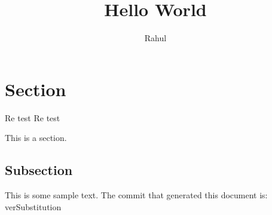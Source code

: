 \documentclass[12pt]{article}
\title{Hello World}
\author{Rahul}
\begin{document}
\maketitle

\section{Section}

Re test Re test

This is a section. 

\subsection{Subsection}

This is some sample text.
The commit that generated this document is: verSubstitution
\end{document}
